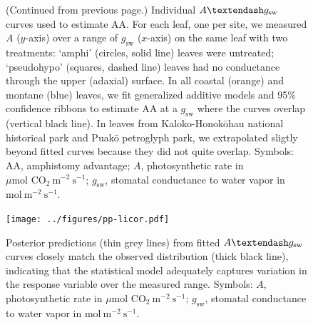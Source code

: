 \documentclass[
  letterpaper,
  DIV=11,
  numbers=noendperiod]{scrartcl}
\begin{document}
\setcounter{figure}{\numexpr\value{figure}-1\relax}

\begin{figure}
  \caption{(Continued from previous page.) Individual $A \textendash g_\mathrm{sw}$ curves used to estimate $\mathrm{AA}$. For each leaf, one per site, we measured $A$ ($y$-axis) over a range of $g_\mathrm{sw}$ ($x$-axis) on the same leaf with two treatments: `amphi' (circles, solid line) leaves were untreated; `pseudohypo' (squares, dashed line) leaves had no conductance through the upper (adaxial) surface. In all coastal (orange) and montane (blue) leaves, we fit generalized additive models and 95\% confidence ribbons to estimate $\mathrm{AA}$ at a $g_\mathrm{sw}$ where the curves overlap (vertical black line). In leaves from Kaloko-Honokōhau national historical park and Puakō petroglyph park, we extrapolated sligtly beyond fitted curves because they did not quite overlap. Symbols: $\mathrm{AA}$, amphistomy advantage; $A$, photosynthetic rate in $\mu \text{mol CO}_2~\text{m}^{-2}~\text{s}^{-1}$; $g_\mathrm{sw}$, stomatal conductance to water vapor in $\text{mol}~\text{m}^{-2}~\text{s}^{-1}$.}
  \label{fig:licor}
\end{figure}

\newpage

\begin{figure}
  \texttt{[image: ../figures/pp-licor.pdf]}
  \caption{Posterior predictions (thin grey lines) from fitted $A \textendash g_\mathrm{sw}$ curves closely match the observed distribution (thick black line), indicating that the statistical model adequately captures variation in the response variable over the measured range. Symbols: $A$, photosynthetic rate in $\mu \text{mol CO}_2~\text{m}^{-2}~\text{s}^{-1}$; $g_\mathrm{sw}$, stomatal conductance to water vapor in $\text{mol}~\text{m}^{-2}~\text{s}^{-1}$.}
  \label{fig:pp-licor}
\end{figure}

\newpage
\end{document}
